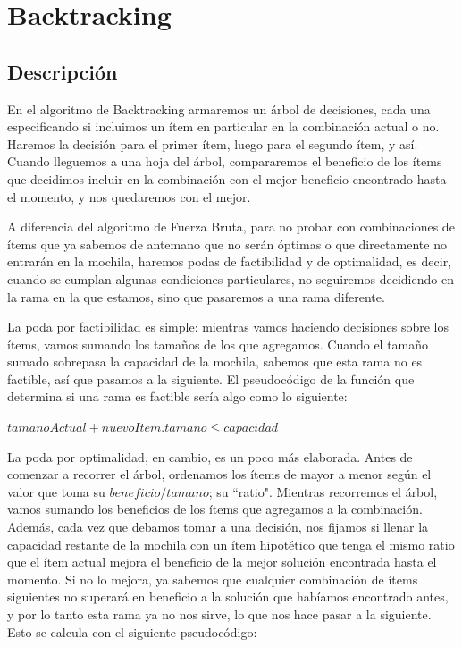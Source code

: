 \documentclass[10pt, a4paper]{article}
\begin{document}
\section{Backtracking}
\subsection{Descripción}
En el algoritmo de Backtracking armaremos un árbol de decisiones, cada una especificando si incluimos un ítem en particular en la combinación actual o no. Haremos la decisión para el primer ítem, luego para el segundo ítem, y así. Cuando lleguemos a una hoja del árbol, compararemos el beneficio de los ítems que decidimos incluir en la combinación con el mejor beneficio encontrado hasta el momento, y nos quedaremos con el mejor.\par
A diferencia del algoritmo de Fuerza Bruta, para no probar con combinaciones de ítems que ya sabemos de antemano que no serán óptimas o que directamente no entrarán en la mochila, haremos podas de factibilidad y de optimalidad, es decir, cuando se cumplan algunas condiciones particulares, no seguiremos decidiendo en la rama en la que estamos, sino que pasaremos a una rama diferente.\par
La poda por factibilidad es simple: mientras vamos haciendo decisiones sobre los ítems, vamos sumando los tamaños de los que agregamos. Cuando el tamaño sumado sobrepasa la capacidad de la mochila, sabemos que esta rama no es factible, así que pasamos a la siguiente. El pseudocódigo de la función que determina si una rama es factible sería algo como lo siguiente:

\begin{algorithm}
\begin{algorithmic}[1]

	\State \Return $tamanoActual + nuevoItem.tamano \leq capacidad$
\EndFunction

\end{algorithmic}
\end{algorithm}

La poda por optimalidad, en cambio, es un poco más elaborada. Antes de comenzar a recorrer el árbol, ordenamos los ítems de mayor a menor según el valor que toma su $beneficio/tamano$; su ``ratio". Mientras recorremos el árbol, vamos sumando los beneficios de los ítems que agregamos a la combinación. Además, cada vez que debamos tomar a una decisión, nos fijamos si llenar la capacidad restante de la mochila con un ítem hipotético que tenga el mismo ratio que el ítem actual mejora el beneficio de la mejor solución encontrada hasta el momento. Si no lo mejora, ya sabemos que cualquier combinación de ítems siguientes no superará en beneficio a la solución que habíamos encontrado antes, y por lo tanto esta rama ya no nos sirve, lo que nos hace pasar a la siguiente. Esto se calcula con el siguiente pseudocódigo:\par
\end{document}
